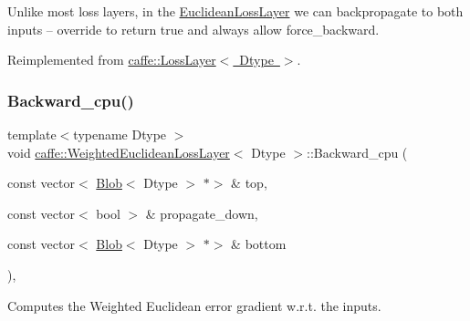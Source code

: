 Unlike most loss layers, in the \mbox{\hyperlink{classcaffe_1_1_euclidean_loss_layer}{Euclidean\+Loss\+Layer}} we can backpropagate to both inputs -- override to return true and always allow force\+\_\+backward. 

Reimplemented from \mbox{\hyperlink{classcaffe_1_1_loss_layer_a36d35155bfe0de53a79c517f33759612}{caffe\+::\+Loss\+Layer$<$ Dtype $>$}}.

\mbox{\label{classcaffe_1_1_weighted_euclidean_loss_layer_a03cab5c47d405a3ee513cc94b238e367}} 
\subsubsection{\texorpdfstring{Backward\+\_\+cpu()}{Backward\_cpu()}\hspace{0.1cm}{\footnotesize\ttfamily [1/2]}}
{\footnotesize\ttfamily template$<$typename Dtype $>$ \\
void \mbox{\hyperlink{classcaffe_1_1_weighted_euclidean_loss_layer}{caffe\+::\+Weighted\+Euclidean\+Loss\+Layer}}$<$ Dtype $>$\+::Backward\+\_\+cpu (\begin{DoxyParamCaption}\item[{const vector$<$ \mbox{\hyperlink{classcaffe_1_1_blob}{Blob}}$<$ Dtype $>$ $\ast$$>$ \&}]{top,  }\item[{const vector$<$ bool $>$ \&}]{propagate\+\_\+down,  }\item[{const vector$<$ \mbox{\hyperlink{classcaffe_1_1_blob}{Blob}}$<$ Dtype $>$ $\ast$$>$ \&}]{bottom }\end{DoxyParamCaption})\hspace{0.3cm}{\ttfamily [protected]}, {\ttfamily [virtual]}}



Computes the Weighted Euclidean error gradient w.\+r.\+t. the inputs. 


